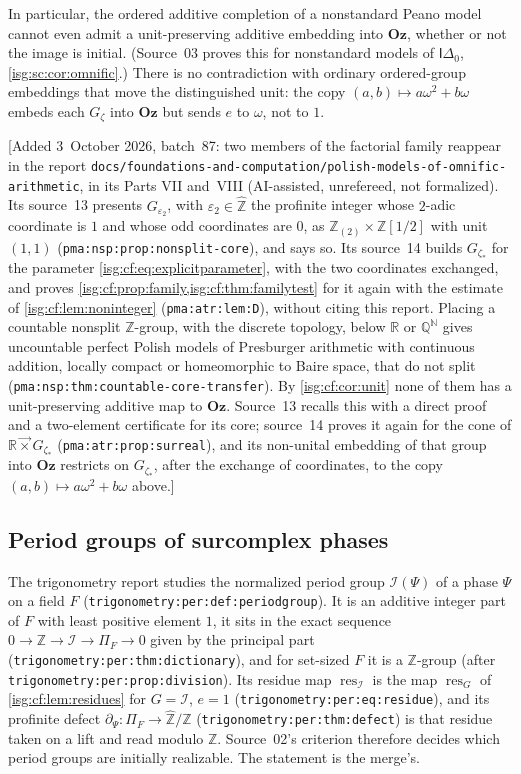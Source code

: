 \documentclass[11pt]{article}
\theoremstyle{definition}
\theoremstyle{remark}
\newcommand{\Oz}{\ensuremath{\mathbf{Oz}}}
\newcommand{\R}{\mathbb{R}}
\newcommand{\Z}{\mathbb{Z}}
\newcommand{\N}{\mathbb{N}}
\newcommand{\lex}{\mathbin{\overrightarrow{\times}}}
\newcommand{\Q}{\mathbb{Q}}
\newcommand{\Zhat}{\widehat{\Z}}
\newcommand{\res}{\operatorname{res}}
\newcommand{\Idelta}{\mathsf{I}\Delta_0}
\newcommand{\replabel}[1]{\nolinkurl{#1}}
\begin{document}
In particular, the ordered additive completion of a nonstandard Peano
model cannot even admit a unit-preserving additive embedding into
$\Oz$, whether or not the image is initial. (Source~03 proves this for
nonstandard models of $\Idelta$, \cref{isg:sc:cor:omnific}.) There is no contradiction
with ordinary ordered-group embeddings that move the distinguished
unit: the copy $(a,b)\mapsto a\omega^2+b\omega$ embeds each
$G_\zeta$ into $\Oz$ but sends $e$ to $\omega$, not to $1$.

\textup{[}Added 3~October 2026, batch~87: two members of the factorial
family reappear in the report
\nolinkurl{docs/foundations-and-computation/polish-models-of-omnific-arithmetic},
in its Parts VII and~VIII (AI-assisted, unrefereed, not formalized). Its
source~13 presents $G_{\varepsilon_2}$, with
$\varepsilon_2\in\Zhat$ the profinite integer whose $2$-adic coordinate is
$1$ and whose odd coordinates are $0$, as $\Z_{(2)}\times\Z[1/2]$ with unit
$(1,1)$ (\replabel{pma:nsp:prop:nonsplit-core}), and says so. Its source~14
builds $G_{\zeta_*}$ for the parameter \eqref{isg:cf:eq:explicitparameter},
with the two coordinates exchanged, and proves
\cref{isg:cf:prop:family,isg:cf:thm:familytest} for it again with the
estimate of \cref{isg:cf:lem:noninteger} (\replabel{pma:atr:lem:D}), without
citing this report. Placing a countable nonsplit $\Z$-group, with the
discrete topology, below $\R$ or $\Q^{\N}$ gives uncountable perfect Polish
models of Presburger arithmetic with continuous addition, locally compact or
homeomorphic to Baire space, that do not split
(\replabel{pma:nsp:thm:countable-core-transfer}). By \cref{isg:cf:cor:unit}
none of them has a unit-preserving additive map to $\Oz$. Source~13 recalls
this with a direct proof and a two-element certificate for its core;
source~14 proves it again for the cone of $\R\lex G_{\zeta_*}$
(\replabel{pma:atr:prop:surreal}), and its non-unital embedding of that
group into $\Oz$ restricts on $G_{\zeta_*}$, after the exchange of
coordinates, to the copy $(a,b)\mapsto a\omega^2+b\omega$ above.\textup{]}

\subsection{Period groups of surcomplex phases}\label{isg:cf:sec:periods}
The trigonometry report studies the normalized period group
$\mathcal I(\Psi)$ of a phase $\Psi$ on a field $F$
(\replabel{trigonometry:per:def:periodgroup}). It is an additive integer
part of $F$ with least positive element $1$, it sits in the exact
sequence $0\to\Z\to\mathcal I\to\Pi_F\to0$ given by the principal part
(\replabel{trigonometry:per:thm:dictionary}), and for set-sized $F$ it is
a $\Z$-group (after \replabel{trigonometry:per:prop:division}). Its
residue map $\res_{\mathcal I}$ is the map $\res_G$ of
\cref{isg:cf:lem:residues} for $G=\mathcal I$, $e=1$
(\replabel{trigonometry:per:eq:residue}), and its profinite defect
$\partial_\Psi:\Pi_F\to\Zhat/\Z$
(\replabel{trigonometry:per:thm:defect}) is that residue taken on a lift
and read modulo $\Z$. Source~02's criterion therefore decides which
period groups are initially realizable. The statement is the merge's.
\end{document}
